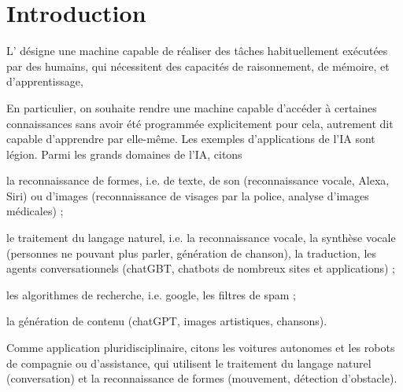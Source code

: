 \documentclass[12pt,fancy]{cours}
\begin{document}


\section{Introduction}

\begin{definition}\label{def:}
    L' désigne une machine capable de réaliser des tâches habituellement exécutées par des humains, qui nécessitent des capacités de raisonnement, de mémoire, et d'apprentissage, 
\end{definition}
 En particulier, on souhaite rendre une machine capable d'accéder à certaines connaissances sans avoir été programmée explicitement pour cela, autrement dit capable d'apprendre par elle-même. 
 Les exemples d'applications de l'IA sont légion. Parmi les grands domaines de l'IA, citons 
 \begin{liste}
    \item la reconnaissance de formes, i.e. de texte, de son (reconnaissance vocale, Alexa, Siri) ou d'images (reconnaissance de visages par la police, analyse d'images médicales) ; 
    \item le traitement du langage naturel, i.e. la reconnaissance vocale, la synthèse vocale (personnes ne pouvant plus parler, génération de chanson), la traduction, les agents conversationnels (chatGBT, chatbots de nombreux sites et applications) ;
    \item les algorithmes de recherche, i.e. google, les filtres de spam ;
    \item la génération de contenu (chatGPT, images artistiques, chansons).
 \end{liste}
  Comme application pluridisciplinaire, citons les voitures autonomes et les robots de compagnie ou d'assistance, qui utilisent le traitement du langage naturel (conversation) et la reconnaissance de formes (mouvement, détection d'obstacle).
\end{document}
